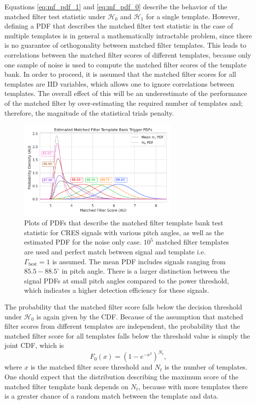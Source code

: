 Equations \ref{eq:mf_pdf_1} and \ref{eq:mf_pdf_0} describe the behavior of the matched filter test statistic under $\mathcal{H}_0$ and $\mathcal{H}_1$ for a single template. However, defining a PDF that describes the matched filter test statistic in the case of multiple templates is in general a mathematically intractable problem, since there is no guarantee of orthogonality between matched filter templates. This leads to correlations between the matched filter scores of different templates, because only one sample of noise is used to compute the matched filter scores of the template bank. In order to proceed, it is assumed that the matched filter scores for all templates are IID variables, which allows one to ignore correlations between templates. The overall effect of this will be an underestimate of the performance of the matched filter by over-estimating the required number of templates and; therefore, the magnitude of the statistical trials penalty.

\begin{figure}[htbp]
    \centering
    \includegraphics[width=0.7\textwidth]{figs/Chapter-4/230329_mf_pdf_by_pitch.png}
    \caption{Plots of PDFs that describe the matched filter template bank test statistic for CRES signals with various pitch angles, as well as the estimated PDF for the noise only case. $10^5$ matched filter templates are used and perfect match between signal and template i.e. $\Gamma_\mathrm{best}=1$ is assumed. The mean PDF includes signals ranging from $85.5-88.5^\circ$ in pitch angle. There is a larger distinction between the signal PDFs at small pitch angles compared to the power threshold, which indicates a higher detection efficiency for these signals.}
    \label{fig:mf_pdf}
\end{figure}

The probability that the matched filter score falls below the decision threshold under $\mathcal{H}_0$ is again given by the CDF. Because of the assumption that matched filter scores from different templates are independent, the probability that the matched filter score for all templates falls below the threshold value is simply the joint CDF, which is
\begin{equation}
    F_{0}(x) = \left(1-e^{-x^2}\right)^{N_t},
    \label{eq:mf_joint_cdf_0}
\end{equation}
where $x$ is the matched filter score threshold and $N_t$ is the number of templates. One should expect that the distribution describing the maximum score of the matched filter template bank depends on $N_t$, because with more templates there is a greater chance of a random match between the template and data.

